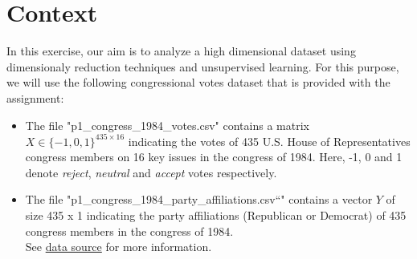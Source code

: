 \section*{Context}
In this exercise, our aim is to analyze a high dimensional dataset using dimensionaly reduction techniques and unsupervised learning. For this purpose, we will use the following congressional votes dataset that is provided with the assignment: 

\begin{itemize}
	\itemsep -0.2em 
	\item The file "p1\_congress\_1984\_votes.csv" contains a matrix $X \in \{-1, 0, 1\}^{435 \times 16}$ indicating the votes of 435 U.S. House of Representatives congress members on 16 key issues in the congress of 1984. Here, -1, 0 and 1 denote \textit{reject}, \textit{neutral} and \textit{accept} votes respectively.
	\item The file "p1\_congress\_1984\_party\_affiliations.csv“" contains a vector $Y$ of size 435 x 1  indicating the party affiliations (Republican or Democrat) of 435 congress members in the congress of 1984. \\See \href{https://archive.ics.uci.edu/ml/datasets/congressional+voting+records}{data source} for more information.
\end{itemize}

\newpage
